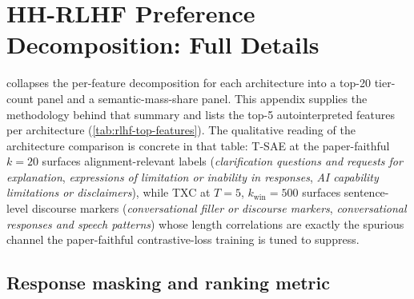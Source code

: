 \section{HH-RLHF Preference Decomposition: Full Details}
\label{app:rlhf}
 collapses the per-feature decomposition for each architecture into a top-20 tier-count panel and a semantic-mass-share panel. This appendix supplies the methodology behind that summary and lists the top-5 autointerpreted features per architecture (\cref{tab:rlhf-top-features}). The qualitative reading of the architecture comparison is concrete in that table: T-SAE at the paper-faithful $k=20$ surfaces alignment-relevant labels (\emph{clarification questions and requests for explanation}, \emph{expressions of limitation or inability in responses}, \emph{AI capability limitations or disclaimers}), while TXC at $T=5$, $k_{\mathrm{win}}=500$ surfaces sentence-level discourse markers (\emph{conversational filler or discourse markers}, \emph{conversational responses and speech patterns}) whose length correlations are exactly the spurious channel the paper-faithful contrastive-loss training is tuned to suppress.

\subsection{Response masking and ranking metric}
\label{app:rlhf-masking}

